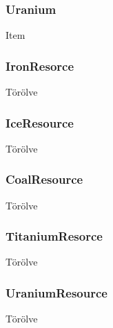 \documentclass[../../projlab]{subfiles}
\begin{document}
\subsubsection{Uranium}
\begin{class-template-baseclass}
    Item
\end{class-template-baseclass}
\begin{class-template-attribute}
\end{class-template-attribute}

\subsubsection{IronResorce}
\begin{class-template-responsibility}
    Törölve
\end{class-template-responsibility}

\subsubsection{IceResource}
\begin{class-template-responsibility}
    Törölve
\end{class-template-responsibility}

\subsubsection{CoalResource}
\begin{class-template-responsibility}
    Törölve
\end{class-template-responsibility}

\subsubsection{TitaniumResorce}
\begin{class-template-responsibility}
    Törölve
\end{class-template-responsibility}

\subsubsection{UraniumResource}
\begin{class-template-responsibility}
    Törölve
\end{class-template-responsibility}
\end{document}
